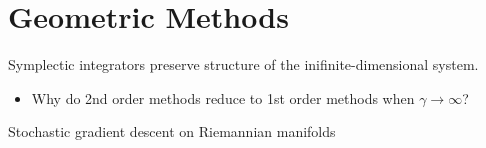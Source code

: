 \section{Geometric Methods}


Symplectic integrators preserve structure of the inifinite-dimensional
system.

\begin{itemize}
    \item Why do 2nd order methods reduce to 1st order methods when
    $\gamma\rightarrow\infty$?
\end{itemize}


Stochastic gradient descent on Riemannian manifolds
